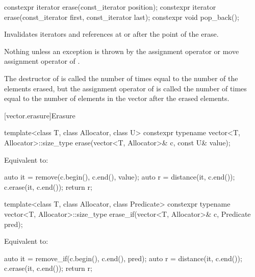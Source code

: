 %
\begin{itemdecl}
constexpr iterator erase(const_iterator position);
constexpr iterator erase(const_iterator first, const_iterator last);
constexpr void pop_back();
\end{itemdecl}

\begin{itemdescr}
\pnum
\effects
Invalidates iterators and references at or after the point of the erase.

\pnum
\throws
Nothing unless an exception is thrown by the
assignment operator or move assignment operator of
.

\pnum
\complexity
The destructor of  is called the number of times equal to the
number of the elements erased, but the assignment operator
of  is called the number of times equal to the number of
elements in the vector after the erased elements.
\end{itemdescr}

[vector.erasure]{Erasure}

%
\begin{itemdecl}
template<class T, class Allocator, class U>
  constexpr typename vector<T, Allocator>::size_type
    erase(vector<T, Allocator>& c, const U& value);
\end{itemdecl}

\begin{itemdescr}
\pnum
\effects
Equivalent to:
\begin{codeblock}
auto it = remove(c.begin(), c.end(), value);
auto r = distance(it, c.end());
c.erase(it, c.end());
return r;
\end{codeblock}
\end{itemdescr}

%
\begin{itemdecl}
template<class T, class Allocator, class Predicate>
  constexpr typename vector<T, Allocator>::size_type
    erase_if(vector<T, Allocator>& c, Predicate pred);
\end{itemdecl}

\begin{itemdescr}
\pnum
\effects
Equivalent to:
\begin{codeblock}
auto it = remove_if(c.begin(), c.end(), pred);
auto r = distance(it, c.end());
c.erase(it, c.end());
return r;
\end{codeblock}
\end{itemdescr}

